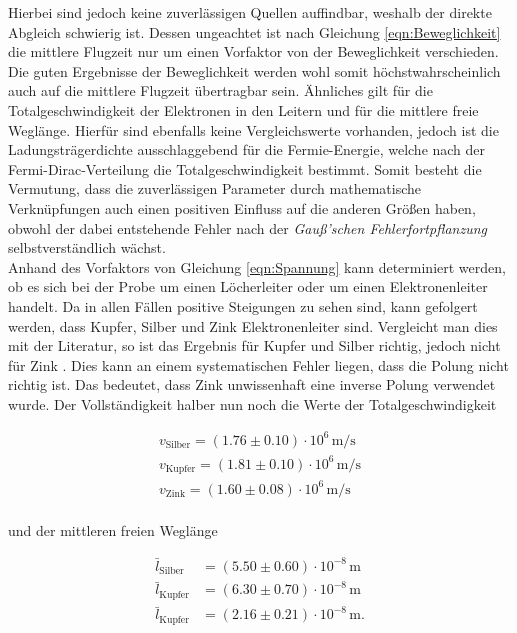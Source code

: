 \noindent Hierbei sind jedoch keine zuverlässigen Quellen auffindbar, weshalb der direkte Abgleich schwierig ist. 
Dessen ungeachtet ist nach Gleichung \eqref{eqn:Beweglichkeit} die mittlere Flugzeit nur um einen Vorfaktor von der 
Beweglichkeit verschieden. Die guten Ergebnisse der Beweglichkeit werden wohl somit höchstwahrscheinlich auch auf die 
mittlere Flugzeit übertragbar sein. Ähnliches gilt für die Totalgeschwindigkeit der Elektronen in den Leitern und für 
die mittlere freie Weglänge. Hierfür sind ebenfalls keine Vergleichswerte vorhanden, jedoch ist die Ladungsträgerdichte 
ausschlaggebend für die Fermie-Energie, welche nach der Fermi-Dirac-Verteilung die Totalgeschwindigkeit bestimmt. Somit 
besteht die Vermutung, dass die zuverlässigen Parameter durch mathematische Verknüpfungen auch einen positiven Einfluss 
auf die anderen Größen haben, obwohl der dabei entstehende Fehler nach der \emph{Gauß'schen Fehlerfortpflanzung} 
selbstverständlich wächst.\\ 
\noindent Anhand des Vorfaktors von Gleichung \eqref{eqn:Spannung} kann determiniert werden, ob es sich bei der Probe um 
einen Löcherleiter oder um einen Elektronenleiter handelt. Da in allen Fällen positive Steigungen zu sehen sind, kann gefolgert 
werden, dass Kupfer, Silber und Zink Elektronenleiter sind. Vergleicht man dies mit der Literatur, so ist das Ergebnis für 
Kupfer und Silber richtig, jedoch nicht für Zink \cite{Elektronenleiter}. Dies kann an einem systematischen Fehler liegen, 
dass die Polung nicht richtig ist. Das bedeutet, dass Zink unwissenhaft eine inverse Polung verwendet wurde.
Der Vollständigkeit halber nun noch die Werte der Totalgeschwindigkeit

\begin{align*}
    v_\text{Silber} = \left(1.76\pm0.10\right)\cdot10^{6}\,\unit{\meter\per\second}\\
    v_\text{Kupfer} = \left(1.81\pm0.10\right)\cdot10^{6}\,\unit{\meter\per\second}\\
    v_\text{Zink}   = \left(1.60\pm0.08\right)\cdot10^{6}\,\unit{\meter\per\second}\\
\end{align*}

\noindent und der mittleren freien Weglänge

\begin{align*}
    \bar{l}_\text{Silber} &= \left(5.50\pm0.60\right)\cdot10^{-8}\,\unit{\meter}\\
    \bar{l}_\text{Kupfer} &= \left(6.30\pm0.70\right)\cdot10^{-8}\,\unit{\meter}\\
    \bar{l}_\text{Kupfer} &= \left(2.16\pm0.21\right)\cdot10^{-8}\,\unit{\meter}.\\
\end{align*}

